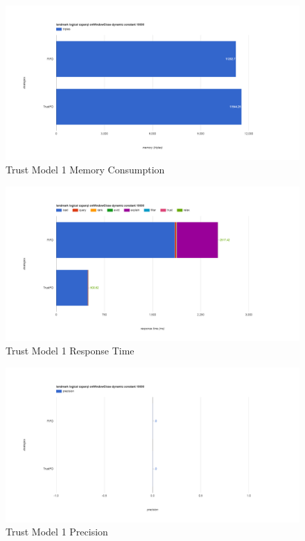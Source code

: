 \begin{figure}[!htbp]
	\centering
    \includegraphics[width=6.5in]{img/app3-trust-1-m.png}
    \caption{Trust Model 1 Memory Consumption}
\end{figure}
\begin{figure}[!htbp]
	\centering
    \includegraphics[width=6.5in]{img/app3-trust-1-r.png}
    \caption{Trust Model 1 Response Time}
\end{figure}
\begin{figure}[!htbp]
	\centering
    \includegraphics[width=6.5in]{img/app3-trust-1-p.png}
    \caption{Trust Model 1 Precision}
\end{figure}
